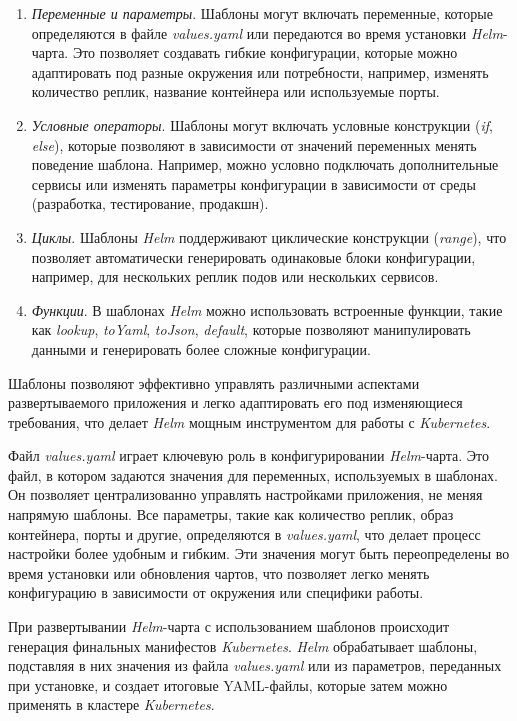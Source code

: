\begin{enumerate}
    \item \textit{Переменные и параметры}. Шаблоны могут включать переменные, которые определяются в файле \textit{values.yaml} или передаются во время установки \textit{Helm}-чарта. Это позволяет создавать гибкие конфигурации, которые можно адаптировать под разные окружения или потребности, например, изменять количество реплик, название контейнера или используемые порты.
    \item \textit{Условные операторы}. Шаблоны могут включать условные конструкции (\textit{if}, \textit{else}), которые позволяют в зависимости от значений переменных менять поведение шаблона. Например, можно условно подключать дополнительные сервисы или изменять параметры конфигурации в зависимости от среды (разработка, тестирование, продакшн).
    \item \textit{Циклы}. Шаблоны \textit{Helm} поддерживают циклические конструкции (\textit{range}), что позволяет автоматически генерировать одинаковые блоки конфигурации, например, для нескольких реплик подов или нескольких сервисов.
    \item \textit{Функции}. В шаблонах \textit{Helm} можно использовать встроенные функции, такие как \textit{lookup}, \textit{toYaml}, \textit{toJson}, \textit{default}, которые позволяют манипулировать данными и генерировать более сложные конфигурации.
\end{enumerate}

Шаблоны позволяют эффективно управлять различными аспектами развертываемого приложения и легко адаптировать его под изменяющиеся требования, что делает \textit{Helm} мощным инструментом для работы с \textit{Kubernetes}.

Файл \textit{values.yaml} играет ключевую роль в конфигурировании \textit{Helm}-чарта. Это файл, в котором задаются значения для переменных, используемых в шаблонах. Он позволяет централизованно управлять настройками приложения, не меняя напрямую шаблоны. Все параметры, такие как количество реплик, образ контейнера, порты и другие, определяются в \textit{values.yaml}, что делает процесс настройки более удобным и гибким. Эти значения могут быть переопределены во время установки или обновления чартов, что позволяет легко менять конфигурацию в зависимости от окружения или специфики работы.

При развертывании \textit{Helm}-чарта с использованием шаблонов происходит генерация финальных манифестов \textit{Kubernetes}. \textit{Helm} обрабатывает шаблоны, подставляя в них значения из файла \textit{values.yaml} или из параметров, переданных при установке, и создает итоговые YAML-файлы, которые затем можно применять в кластере \textit{Kubernetes}.

